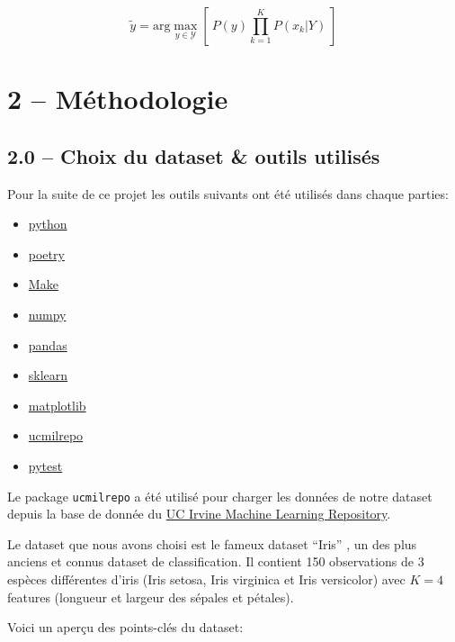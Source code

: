 \documentclass[
]{article}
\providecommand{\tightlist}{%
  \setlength{\itemsep}{0pt}\setlength{\parskip}{0pt}}
\begin{document}
\[
\tilde{y} = \text{arg}\max_{y \in \mathcal{Y}} \left[\  P(y) \prod_{k = 1}^K{P(x_k | Y)}\  \right]
\]

\section{2 -- Méthodologie}\label{muxe9thodologie}

\subsection{2.0 -- Choix du dataset \& outils
utilisés}\label{choix-du-dataset-outils-utilisuxe9s}

Pour la suite de ce projet les outils suivants ont été utilisés dans
chaque parties:

\begin{itemize}
\tightlist
\item
  \href{https://www.python.org/}{python}
\item
  \href{https://python-poetry.org/}{poetry}
\item
  \href{https://www.gnu.org/software/make/}{Make}
\item
  \href{https://numpy.org/}{numpy}
\item
  \href{https://pandas.pydata.org/}{pandas}
\item
  \href{https://scikit-learn.org/stable/}{sklearn}
\item
  \href{https://matplotlib.org/}{matplotlib}
\item
  \href{https://github.com/uci-ml-repo/ucimlrepo}{ucmilrepo}
\item
  \href{https://docs.pytest.org/en/stable/}{pytest}
\end{itemize}

Le package \texttt{ucmilrepo} a été utilisé pour charger les données de
notre dataset depuis la base de donnée du
\href{https://archive.ics.uci.edu/ml/index}{UC Irvine Machine Learning
Repository}.

Le dataset que nous avons choisi est le fameux dataset ``Iris''
\cite{r.a.fisherIris1936}, un des plus anciens et connus dataset de
classification. Il contient 150 observations de 3 espèces différentes
d'iris (Iris setosa, Iris virginica et Iris versicolor) avec \(K = 4\)
features (longueur et largeur des sépales et pétales).

Voici un aperçu des points-clés du dataset:
\end{document}
